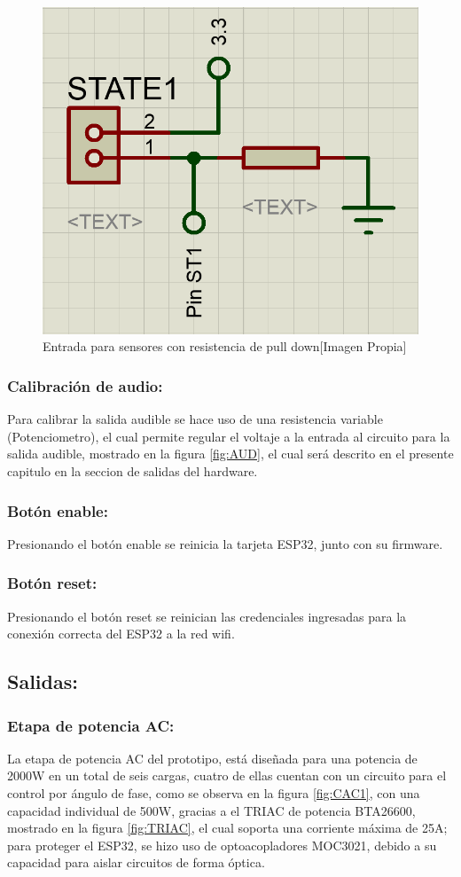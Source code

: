 		\begin{figure}[H]
			\centering
			\caption{Entrada para sensores con resistencia de pull down[Imagen Propia]}
			\label{fig:ST}
			\includegraphics[width=0.5\linewidth]{Imagenes/ST}
		\end{figure}		
	
	\subsubsection{Calibración de audio:}
		Para calibrar la salida audible se hace uso de una resistencia variable (Potenciometro), el cual permite regular el voltaje a la entrada al circuito para la salida audible, mostrado en la figura \ref{fig:AUD}, el cual será descrito en el presente capitulo en la seccion de salidas del hardware.\\
		
	\subsubsection{Botón enable:}
		Presionando el botón enable se reinicia la tarjeta ESP32, junto con su firmware.\\
		
	\subsubsection{Botón reset:}
		Presionando el botón reset se reinician las credenciales ingresadas para la conexión correcta del ESP32 a la red wifi.\\
		
	\subsection{Salidas:}
	\subsubsection{Etapa de potencia AC:}
		La etapa de potencia AC del prototipo, está diseñada para una potencia de 2000W en un total de seis cargas, cuatro de ellas cuentan con un circuito para el control por ángulo de fase, como se observa en la figura \ref{fig:CAC1}, con una capacidad individual de 500W, gracias a el TRIAC de potencia BTA26600, mostrado en la figura \ref{fig:TRIAC}, el cual soporta una corriente máxima de 25A; para proteger el ESP32, se hizo uso de optoacopladores MOC3021, debido a su capacidad para aislar circuitos de forma óptica.\\
		

